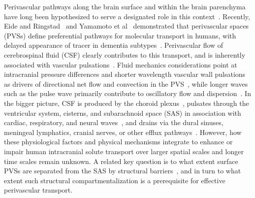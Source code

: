 \documentclass[fleqn,10pt]{wlscirep}
\begin{document}
Perivascular pathways along the brain surface and within the brain
parenchyma have long been hypothesized to serve a designated role in
this context~\cite{rennels1985evidence, zhang1990interrelationships,
  ichimura1991distribution, carare2008solutes, iliff2012paravascular,
  foley2012realtime, hannocks2018molecular, van2024caa}. Recently, Eide and
Ringstad~\cite{eide2024functional} and Yamamoto et
al~\cite{yamamoto2024perivascular} demonstrated that perivascular
spaces (PVSs) define preferential pathways for molecular transport in
humans, with delayed appearance of tracer in dementia
subtypes~\cite{eide2024functional}. Perivascular flow of cerebrospinal
fluid (CSF) clearly contributes to this transport, and is inherently
associated with vascular pulsations~\cite{hadaczek2006perivascular,
  iliff2013cerebral, bedussi2018paravascular, mestre2018flow,
  boster2023artificial, hirschler2024region}. Fluid mechanics
considerations point at intracranial pressure differences and shorter
wavelength vascular wall pulsations as drivers of directional net flow
and convection in the PVS~\cite{bilston2003arterial, rey2018pulsatile,
  daversin2020mechanisms, kedarasetti2020functional,
  gjerde2023directional, nozaleda2024arterial}, while longer waves
such as the pulse wave primarily contribute to oscillatory flow and
dispersion~\cite{asgari2016glymphatic, sharp2019dispersion, thomas2019fluid,
  kedarasetti2020arterial, troyetsky2021dispersion, 
  martinac2021phase}. In the bigger picture, CSF is produced by the
choroid plexus~\cite{damkier2013cerebrospinal,
  steffensen2018cotransporter, liu2020direct}, pulsates through the
ventricular system, cisterns, and subarachnoid space (SAS) in
association with cardiac, respiratory, and neural
waves~\cite{greitz1993pulsatile, wagshul2011pulsating,
  sweetman2011cerebrospinal, fultz2019coupled, vinje2019respiratory,
  eide2021direction, causemann2022human, williams2023neural,
  zimmermann2023total}, and drains via the dural sinuses, meningeal
lymphatics, cranial nerves, or other efflux
pathways~\cite{proulx2021cerebrospinal}. However, how these
physiological factors and physical mechanisms integrate to enhance or
impair human intracranial solute transport over larger spatial
scales and longer time scales remain unknown. A related key question
is to what extent surface PVSs are separated from the SAS by
structural barriers~\cite{zhang1990interrelationships,
  weller2005microscopic, bedussi2017paravascular,
  pizzo2018intrathecal, mestre2022periarteriolar,
  mollgard2023mesothelium, smets2024perivascular, eide2024functional},
and in turn to what extent such structural compartmentalization is a
prerequisite for effective perivascular transport.
 
\end{document}
